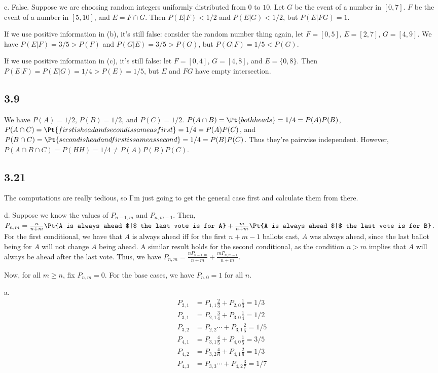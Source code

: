 \documentclass{article}
\begin{document}
c. False. Suppose we are choosing random integers uniformly distributed from $0$ to $10$. Let $G$ be the event of a number in $[0,7]$. $F$ be the event of a number in $[5,10]$, and $E=F\cap G$. Then $P(E|F)<1/2$ and $P(E|G)<1/2$, but $P(E|FG)=1$. 

If we use positive information in (b), it's still false: consider the random number thing again, let $F=[0,5]$, $E=[2,7]$, $G=[4,9]$. We have $P(E|F)=3/5>P(F)$ and $P(G|E)=3/5>P(G)$, but $P(G|F)=1/5<P(G)$.

If we use positive information in (c), it's still false: let $F=[0,4]$, $G=[4,8]$, and $E=\{0,8\}$. Then $P(E|F)=P(E|G)=1/4>P(E)=1/5$, but $E$ and $FG$ have empty intersection.
\subsection*{3.9}
We have $P(A)=1/2$, $P(B)=1/2$, and $P(C)=1/2$. $P(A\cap B)=\Pt{both heads}=1/4=P(A)P(B)$, $P(A\cap C)=\Pt{first is head and second is same as first}=1/4=P(A)P(C)$, and $P(B\cap C)=\Pt{second is head and first is same as second}=1/4=P(B)P(C)$. Thus they're pairwise independent. However, $P(A\cap B\cap C)=P(HH)=1/4\neq P(A)P(B)P(C)$.
\subsection*{3.21}
The computations are really tedious, so I'm just going to get the general case first and calculate them from there.

d. Suppose we know the values of $P_{n-1,m}$ and $P_{n,m-1}$. Then, $P_{n,m}=\frac{n}{n+m}\Pt{A is always ahead $|$ the last vote is for A}+\frac{m}{n+m}\Pt{A is always ahead $|$ the last vote is for B}$. For the first conditional, we have that $A$ is always ahead iff for the first $n+m-1$ ballots cast, $A$ was always ahead, since the last ballot being for $A$ will not change $A$ being ahead. A similar result holds for the second conditional, as the condition $n>m$ implies that $A$ will always be ahead after the last vote. Thus, we have $P_{n,m}=\frac{nP_{n-1,m}}{n+m}+\frac{mP_{n,m-1}}{n+m}$.

Now, for all $m\geq n$, fix $P_{n,m}=0$. For the base cases, we have $P_{n,0}=1$ for all $n$.

a.\begin{align*} 
    P_{2,1}&=P_{1,1}\frac{2}{3}+P_{2,0}\frac{1}{3}=1/3\\
    P_{3,1}&=P_{2,1}\frac{3}{4}+P_{3,0}\frac{1}{4}=1/2\\
    P_{3,2}&=P_{2,2}\cdots+P_{3,1}\frac{2}{5}=1/5\\
    P_{4,1}&=P_{3,1}\frac{4}{5}+P_{4,0}\frac{1}{5}=3/5\\
    P_{4,2}&=P_{3,2}\frac{4}{6}+P_{4,1}\frac{2}{6}=1/3\\
    P_{4,3}&=P_{3,3}\cdots+P_{4,2}\frac{3}{7}=1/7\\
\end{align*}
\end{document}
